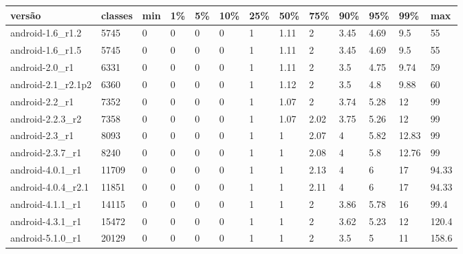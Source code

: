 \begin{tabular}{|l|l|l|l|l|l|l|l|l|l|l|l|l|}
\hline
versão&classes&min&1\%&5\%&10\%&25\%&50\%&75\%&90\%&95\%&99\%&max\\
\hline
android-1.6\_r1.2&5745&0&0&0&0&1&1.11&2&3.45&4.69&9.5&55\\
\hline
android-1.6\_r1.5&5745&0&0&0&0&1&1.11&2&3.45&4.69&9.5&55\\
\hline
android-2.0\_r1&6331&0&0&0&0&1&1.11&2&3.5&4.75&9.74&59\\
\hline
android-2.1\_r2.1p2&6360&0&0&0&0&1&1.12&2&3.5&4.8&9.88&60\\
\hline
android-2.2\_r1&7352&0&0&0&0&1&1.07&2&3.74&5.28&12&99\\
\hline
android-2.2.3\_r2&7358&0&0&0&0&1&1.07&2.02&3.75&5.26&12&99\\
\hline
android-2.3\_r1&8093&0&0&0&0&1&1&2.07&4&5.82&12.83&99\\
\hline
android-2.3.7\_r1&8240&0&0&0&0&1&1&2.08&4&5.8&12.76&99\\
\hline
android-4.0.1\_r1&11709&0&0&0&0&1&1&2.13&4&6&17&94.33\\
\hline
android-4.0.4\_r2.1&11851&0&0&0&0&1&1&2.11&4&6&17&94.33\\
\hline
android-4.1.1\_r1&14115&0&0&0&0&1&1&2&3.86&5.78&16&99.4\\
\hline
android-4.3.1\_r1&15472&0&0&0&0&1&1&2&3.62&5.23&12&120.4\\
\hline
android-5.1.0\_r1&20129&0&0&0&0&1&1&2&3.5&5&11&158.6\\
\hline
\end{tabular}
